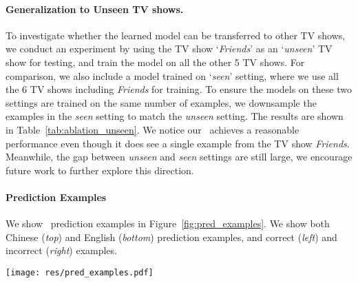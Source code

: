  

\paragraph{Generalization to Unseen TV shows.} 
To investigate whether the learned model can be transferred to other TV shows, we conduct an experiment by using the TV show `\textit{Friends}' as an `\textit{unseen}' TV show for testing, and train the model on all the other 5 TV shows. 
For comparison, we also include a model trained on `\textit{seen}' setting, where we use all the 6 TV shows including \textit{Friends} for training. 
To ensure the models on these two settings are trained on the same number of examples, we downsample the examples in the \textit{seen} setting to match the \textit{unseen} setting.
The results are shown in Table~\ref{tab:ablation_unseen}.
We notice our \ModelName~achieves a reasonable performance even though it does see a single example from the TV show \textit{Friends}.
Meanwhile, the gap between \textit{unseen} and \textit{seen} settings are still large, we encourage future work to further explore this direction.


\paragraph{Prediction Examples}
We show \ModelName~prediction examples in Figure~\ref{fig:pred_examples}. 
We show both Chinese (\textit{top}) and English (\textit{bottom}) prediction examples, and correct (\textit{left}) and incorrect (\textit{right}) examples.


\begin{figure*}[!t]
  \texttt{[image: res/pred\_examples.pdf]}
  \caption{
  Qualitative examples of \ModelName. \textit{Top:} examples in Chinese. \textit{Bottom:} examples in English. \textit{Left:} correct predictions. \textit{Right:} incorrect predictions.
  We show top-3 retrieved moments for each query. \textcolor{salmon}{salmon bar} shows the predictions, \textcolor{ForestGreen}{green box} indicates the ground truth.
  }
  \label{fig:pred_examples}
\end{figure*}
